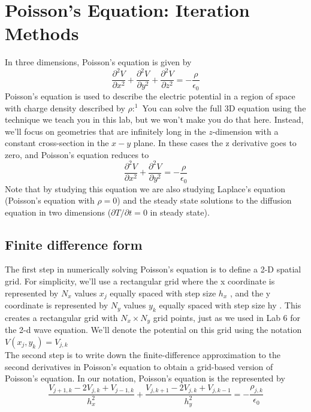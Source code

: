 \documentclass{book}
\theoremstyle{plain}
\theoremstyle{definition}
\numberwithin{exm}{chapter}
\theoremstyle{remark}
\theoremstyle{summary}
\theoremstyle{overview}
\begin{document}
\chapter*{Poisson\rq s Equation: Iteration Methods}
In three dimensions, Poisson\rq s equation is given by
\begin{equation}\label{eq:91}
\frac{\partial^{2} V}{\partial x^{2}}+\frac{\partial^{2} V}{\partial y^{2}}+\frac{\partial^{2} V}{\partial z^{2}}=-\frac{\rho}{\epsilon_{0}}
\end{equation}
Poisson\rq s equation is used to describe the electric potential in a region of space
with charge density described by $ρ:^1$ You can solve the full 3D equation using
the technique we teach you in this lab, but we won’t make you do that here.
Instead, we’ll focus on geometries that are infinitely long in the $z$-dimension with
a constant cross-section in the $x - y$ plane. In these cases the z derivative goes to
zero, and Poisson\rq s equation reduces to
\begin{equation}\label{eq:92}
\frac{\partial^{2} V}{\partial x^{2}}+\frac{\partial^{2} V}{\partial y^{2}}=-\frac{\rho}{\epsilon_{0}}
\end{equation}
Note that by studying this equation we are also studying Laplace\rq s equation (Poisson\rq s equation with $\rho = 0$) and the steady state solutions to the diffusion equation
in two dimensions ($\partial T / \partial t = 0$ in steady state).


\section*{Finite difference form}
The first step in numerically solving Poisson\rq s equation is to define a 2-D spatial grid. For simplicity, we\rq ll use a rectangular grid where the x coordinate is represented by $N_x$ values $x_j$ equally spaced with step size $h_x$ , and the y coordinate is represented by $N_y$ values $y_k$ equally spaced with step size hy . This
creates a rectangular grid with $N_x × N_y$ grid points, just as we used in Lab 6 for
the 2-d wave equation. We\rq ll denote the potential on this grid using the notation $V(x_j,y_k) = V_{j,k}$ \\
The second step is to write down the finite-difference approximation to the
second derivatives in Poisson\rq s equation to obtain a grid-based version of Poisson\rq s
equation. In our notation, Poisson\rq s equation is the represented by
\begin{equation}\label{eq:93}
\frac{V_{j+1, k}-2 V_{j, k}+V_{j-1, k}}{h_{x}^{2}}+\frac{V_{j, k+1}-2 V_{j, k}+V_{j, k-1}}{h_{y}^{2}}=-\frac{\rho_{j, k}}{\epsilon_{0}}
\end{equation}
\end{document}
